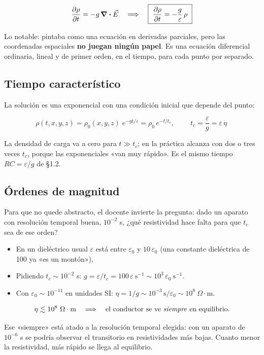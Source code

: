 \documentclass[12pt,a4paper]{article}
\begin{document}
\[
\pdv{\rho}{t} = -g\,\div \vec E
\quad\Longrightarrow\quad
\boxed{\ \pdv{\rho}{t} = -\frac{g}{\varepsilon}\,\rho\ }
\]

Lo notable: pintaba como una ecuación en derivadas parciales, pero las
coordenadas espaciales \textbf{no juegan ningún papel}. Es una ecuación diferencial
ordinaria, lineal y de primer orden, en el tiempo, para cada punto por separado.

\subsection{Tiempo característico}

La solución es una exponencial con una condición inicial que depende del punto:

\[
\rho(t,x,y,z) = \rho_0(x,y,z)\;e^{-g t/\varepsilon}
= \rho_0\,e^{-t/t_c},
\qquad
\boxed{\ t_c = \frac{\varepsilon}{g} = \varepsilon\,\eta\ }
\]

La densidad de carga va a cero para $t \gg t_c$; en la práctica alcanza con dos
o tres veces $t_c$, porque las exponenciales «van muy rápido». Es el mismo
tiempo $RC = \varepsilon/g$ de §1.2.

\subsection{Órdenes de magnitud}

Para que no quede abstracto, el docente invierte la pregunta: dado un aparato
con resolución temporal buena, $10^{-2}$ s, ¿qué resistividad hace falta para
que $t_c$ sea de ese orden?

\begin{itemize}
  \item En un dieléctrico usual $\varepsilon$ está entre $\varepsilon_0$ y
  $10\,\varepsilon_0$ (una constante dieléctrica de 100 ya «es un montón»).
  \item Pidiendo $t_c \sim 10^{-2}$ s: $g = \varepsilon/t_c = 100\,\varepsilon\ \text{s}^{-1}
  \sim 10^{3}\,\varepsilon_0\ \text{s}^{-1}$.
  \item Con $\varepsilon_0 \sim 10^{-11}$ en unidades SI:
  $\eta = 1/g \sim 10^{-3}\,\text{s}/\varepsilon_0 \sim 10^{8}\ \Omega\cdot$m.
\end{itemize}

\[
\eta \lesssim 10^{8}\ \Omega\cdot\text{m}
\quad\Longrightarrow\quad
\text{el conductor se ve \emph{siempre} en equilibrio.}
\]

Ese «siempre» está atado a la resolución temporal elegida: con un aparato de
$10^{-6}$ s se podría observar el transitorio en resistividades más bajas.
Cuanto menor la resistividad, más rápido se llega al equilibrio.
\end{document}

